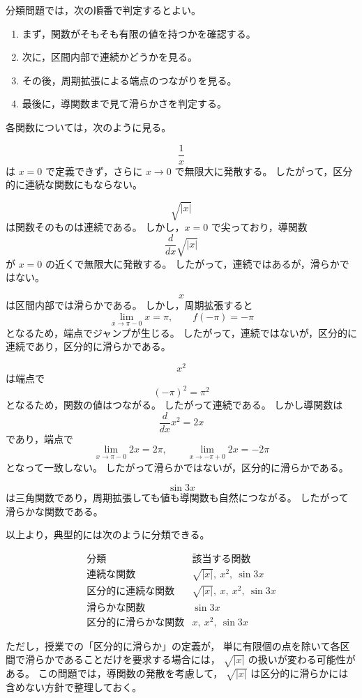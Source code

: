 \begin{strategy}
	分類問題では，次の順番で判定するとよい。
	
	\begin{enumerate}
		\item まず，関数がそもそも有限の値を持つかを確認する。
		\item 次に，区間内部で連続かどうかを見る。
		\item その後，周期拡張による端点のつながりを見る。
		\item 最後に，導関数まで見て滑らかさを判定する。
	\end{enumerate}
	
	各関数については，次のように見る。
	
	\[
	\frac{1}{x}
	\]
	は \(x=0\) で定義できず，さらに \(x\to 0\) で無限大に発散する。
	したがって，区分的に連続な関数にもならない。
	
	\[
	\sqrt{|x|}
	\]
	は関数そのものは連続である。
	しかし，\(x=0\) で尖っており，導関数
	\[
	\frac{d}{dx}\sqrt{|x|}
	\]
	が \(x=0\) の近くで無限大に発散する。
	したがって，連続ではあるが，滑らかではない。
	
	\[
	x
	\]
	は区間内部では滑らかである。
	しかし，周期拡張すると
	\[
	\lim_{x\to \pi-0} x=\pi,\qquad f(-\pi)=-\pi
	\]
	となるため，端点でジャンプが生じる。
	したがって，連続ではないが，区分的に連続であり，区分的に滑らかである。
	
	\[
	x^2
	\]
	は端点で
	\[
	(-\pi)^2=\pi^2
	\]
	となるため，関数の値はつながる。
	したがって連続である。
	しかし導関数は
	\[
	\frac{d}{dx}x^2=2x
	\]
	であり，端点で
	\[
	\lim_{x\to \pi-0}2x=2\pi,\qquad
	\lim_{x\to -\pi+0}2x=-2\pi
	\]
	となって一致しない。
	したがって滑らかではないが，区分的に滑らかである。
	
	\[
	\sin 3x
	\]
	は三角関数であり，周期拡張しても値も導関数も自然につながる。
	したがって滑らかな関数である。
	
	\medskip
	
	以上より，典型的には次のように分類できる。
	
	\[
	\begin{array}{c|l}
		\text{分類} & \text{該当する関数} \\ \hline
		\text{連続な関数}
		& \sqrt{|x|},\ x^2,\ \sin 3x \\
		\text{区分的に連続な関数}
		& \sqrt{|x|},\ x,\ x^2,\ \sin 3x \\
		\text{滑らかな関数}
		& \sin 3x \\
		\text{区分的に滑らかな関数}
		& x,\ x^2,\ \sin 3x
	\end{array}
	\]
	
	ただし，授業での「区分的に滑らか」の定義が，
	単に有限個の点を除いて各区間で滑らかであることだけを要求する場合には，
	\(\sqrt{|x|}\) の扱いが変わる可能性がある。
	この問題では，導関数の発散を考慮して，
	\(\sqrt{|x|}\) は区分的に滑らかには含めない方針で整理しておく。
\end{strategy}